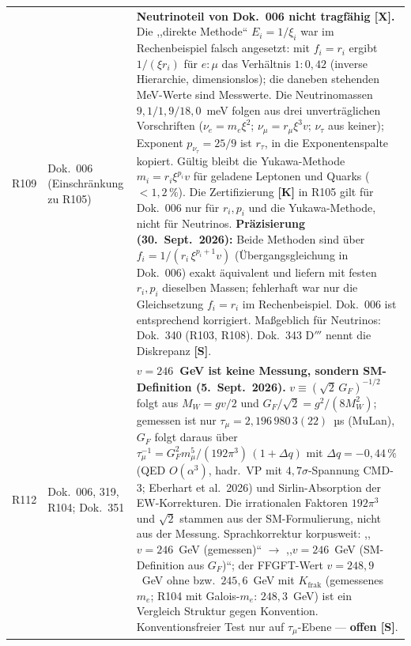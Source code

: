 \begin{longtable}{@{}p{0.9cm}p{3.1cm}p{10.2cm}@{}}
R109 & Dok.~006 (Einschränkung zu R105) & \textbf{Neutrinoteil von Dok.~006 nicht tragfähig [X].} Die ,,direkte Methode`` $E_i=1/\xi_i$ war im Rechenbeispiel falsch angesetzt: mit $f_i=r_i$ ergibt $1/(\xi r_i)$ für $e{:}\mu$ das Verhältnis $1{:}0{,}42$ (inverse Hierarchie, dimensionslos); die daneben stehenden MeV-Werte sind Messwerte. Die Neutrinomassen $9{,}1/1{,}9/18{,}0$~meV folgen aus drei unverträglichen Vorschriften ($\nu_e=m_e\xi^2$; $\nu_\mu=r_\mu\xi^3 v$; $\nu_\tau$ aus keiner); Exponent $p_{\nu_\tau}=25/9$ ist $r_\tau$, in die Exponentenspalte kopiert. Gültig bleibt die Yukawa-Methode $m_i=r_i\xi^{p_i}v$ für geladene Leptonen und Quarks ($<1{,}2\,\%$). Die Zertifizierung \textbf{[K]} in R105 gilt für Dok.~006 nur für $r_i,p_i$ und die Yukawa-Methode, nicht für Neutrinos. \textbf{Präzisierung (30.~Sept.~2026):} Beide Methoden sind über $f_i=1/(r_i\,\xi^{p_i+1}v)$ (Übergangsgleichung in Dok.~006) exakt äquivalent und liefern mit festen $r_i,p_i$ dieselben Massen; fehlerhaft war nur die Gleichsetzung $f_i=r_i$ im Rechenbeispiel. Dok.~006 ist entsprechend korrigiert. Maßgeblich für Neutrinos: Dok.~340 (R103, R108). Dok.~343 D$'''$ nennt die Diskrepanz \textbf{[S]}. \\
R112 & Dok.~006, 319, R104; Dok.~351 & \textbf{$v=246$~GeV ist keine Messung, sondern SM-Definition \QM{} (5.~Sept.~2026).} $v\equiv(\sqrt2\,G_F)^{-1/2}$ folgt aus $M_W=gv/2$ und $G_F/\sqrt2=g^2/(8M_W^2)$; gemessen ist nur $\tau_\mu=2{,}196\,980\,3(22)$~µs (MuLan), $G_F$ folgt daraus über $\tau_\mu^{-1}=G_F^2m_\mu^5/(192\pi^3)\,(1+\Delta q)$ mit $\Delta q=-0{,}44\,\%$ (QED $O(\alpha^3)$, hadr.\ VP mit $4{,}7\sigma$-Spannung CMD-3; Eberhart et al.\ 2026) und Sirlin-Absorption der EW-Korrekturen. Die irrationalen Faktoren $192\pi^3$ und $\sqrt2$ stammen aus der SM-Formulierung, nicht aus der Messung. Sprachkorrektur korpusweit: ,,$v=246$~GeV (gemessen)`` $\to$ ,,$v=246$~GeV (SM-Definition aus $G_F$)``; der FFGFT-Wert $v=248{,}9$~GeV ohne bzw.\ $245{,}6$~GeV mit $K_{\mathrm{frak}}$ (gemessenes $m_e$; R104 mit Galois-$m_e$: $248{,}3$~GeV) ist ein Vergleich Struktur gegen Konvention. Konventionsfreier Test nur auf $\tau_\mu$-Ebene --- \textbf{offen [S]}. \\

\end{longtable}

